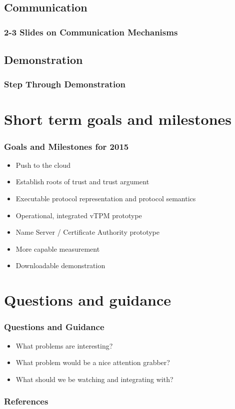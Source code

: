 \documentclass{beamer}
\begin{document}
\subsection{Communication}

\begin{frame}
  \frametitle{2-3 Slides on Communication Mechanisms}
\end{frame}

\subsection{Demonstration}

\begin{frame}
  \frametitle{Step Through Demonstration}
\end{frame}

\section{Short term goals and milestones}

\begin{frame}
  \frametitle{Goals and Milestones for 2015}

  \begin{itemize}
  \item Push to the cloud
  \item Establish roots of trust and trust argument
  \item Executable protocol representation and protocol semantics
  \item Operational, integrated vTPM prototype
  \item Name Server / Certificate Authority prototype
  \item More capable measurement
  \item Downloadable demonstration
  \end{itemize}
\end{frame}

\section{Questions and guidance}

\begin{frame}
  \frametitle{Questions and Guidance}

  \begin{itemize}
  \item What problems are interesting?
  \item What problem would be a nice attention grabber?
  \item What should we be watching and integrating with?
  \end{itemize}
\end{frame}

\nocite{Coker::Principles-of-R,Haldar:04:Semantic-Remote}

\begin{frame}
  \frametitle{References}
  
\end{frame}
\end{document}
